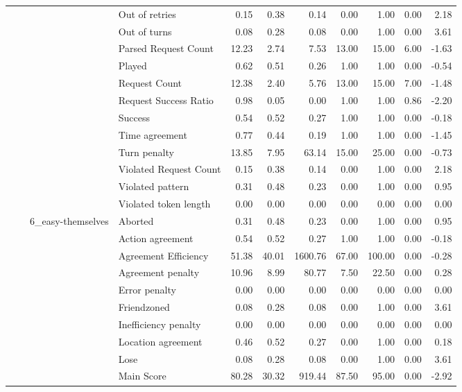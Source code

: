 \begin{tabular}{llllrrrrrrr}
 &  &  & Out of retries & 0.15 & 0.38 & 0.14 & 0.00 & 1.00 & 0.00 & 2.18 \\
 &  &  & Out of turns & 0.08 & 0.28 & 0.08 & 0.00 & 1.00 & 0.00 & 3.61 \\
 &  &  & Parsed Request Count & 12.23 & 2.74 & 7.53 & 13.00 & 15.00 & 6.00 & -1.63 \\
 &  &  & Played & 0.62 & 0.51 & 0.26 & 1.00 & 1.00 & 0.00 & -0.54 \\
 &  &  & Request Count & 12.38 & 2.40 & 5.76 & 13.00 & 15.00 & 7.00 & -1.48 \\
 &  &  & Request Success Ratio & 0.98 & 0.05 & 0.00 & 1.00 & 1.00 & 0.86 & -2.20 \\
 &  &  & Success & 0.54 & 0.52 & 0.27 & 1.00 & 1.00 & 0.00 & -0.18 \\
 &  &  & Time agreement & 0.77 & 0.44 & 0.19 & 1.00 & 1.00 & 0.00 & -1.45 \\
 &  &  & Turn penalty & 13.85 & 7.95 & 63.14 & 15.00 & 25.00 & 0.00 & -0.73 \\
 &  &  & Violated Request Count & 0.15 & 0.38 & 0.14 & 0.00 & 1.00 & 0.00 & 2.18 \\
 &  &  & Violated pattern & 0.31 & 0.48 & 0.23 & 0.00 & 1.00 & 0.00 & 0.95 \\
 &  &  & Violated token length & 0.00 & 0.00 & 0.00 & 0.00 & 0.00 & 0.00 & 0.00 \\
\cline{3-11}
 &  & \multirow[t]{27}{*}{6_easy-themselves} & Aborted & 0.31 & 0.48 & 0.23 & 0.00 & 1.00 & 0.00 & 0.95 \\
 &  &  & Action agreement & 0.54 & 0.52 & 0.27 & 1.00 & 1.00 & 0.00 & -0.18 \\
 &  &  & Agreement Efficiency & 51.38 & 40.01 & 1600.76 & 67.00 & 100.00 & 0.00 & -0.28 \\
 &  &  & Agreement penalty & 10.96 & 8.99 & 80.77 & 7.50 & 22.50 & 0.00 & 0.28 \\
 &  &  & Error penalty & 0.00 & 0.00 & 0.00 & 0.00 & 0.00 & 0.00 & 0.00 \\
 &  &  & Friendzoned & 0.08 & 0.28 & 0.08 & 0.00 & 1.00 & 0.00 & 3.61 \\
 &  &  & Inefficiency penalty & 0.00 & 0.00 & 0.00 & 0.00 & 0.00 & 0.00 & 0.00 \\
 &  &  & Location agreement & 0.46 & 0.52 & 0.27 & 0.00 & 1.00 & 0.00 & 0.18 \\
 &  &  & Lose & 0.08 & 0.28 & 0.08 & 0.00 & 1.00 & 0.00 & 3.61 \\
 &  &  & Main Score & 80.28 & 30.32 & 919.44 & 87.50 & 95.00 & 0.00 & -2.92 \\

\end{tabular}
